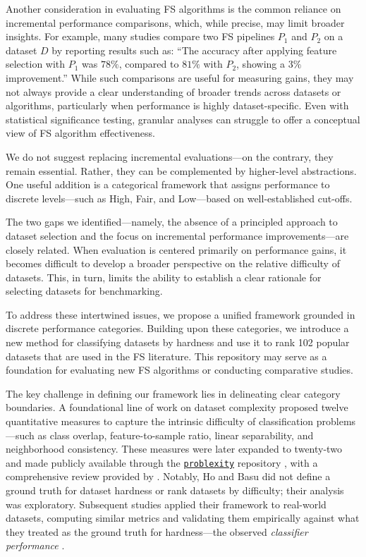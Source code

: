 \documentclass[preprint,12pt,authoryear]{elsarticle}
\begin{document}
Another consideration in evaluating FS algorithms is the common reliance on incremental performance comparisons, which, while precise, may limit broader insights. For example, many studies compare two FS pipelines \(P_1\) and \(P_2\) on a dataset \(D\) by reporting results such as: “The accuracy after applying feature selection with \(P_1\) was \(78\%\), compared to \(81\%\) with \(P_2\), showing a \(3\%\) improvement.” While such comparisons are useful for measuring gains, they may not always provide a clear understanding of broader trends across datasets or algorithms, particularly when performance is highly dataset-specific. Even with statistical significance testing, granular analyses can struggle to offer a conceptual view of FS algorithm effectiveness.

We do not suggest replacing incremental evaluations—on the contrary, they remain essential. Rather, they can be complemented by higher-level abstractions. One useful addition is a categorical framework that assigns performance to discrete levels—such as High, Fair, and Low—based on well-established cut-offs. 

The two gaps we identified—namely, the absence of a principled approach to dataset selection and the focus on incremental performance improvements—are closely related. When evaluation is centered primarily on performance gains, it becomes difficult to develop a broader perspective on the relative difficulty of datasets. This, in turn, limits the ability to establish a clear rationale for selecting datasets for benchmarking.

To address these intertwined issues, we propose a unified framework grounded in discrete performance categories. Building upon these categories, we introduce a new method for classifying datasets by hardness and use it to rank 102 popular datasets that are used in the FS literature. This repository may serve as a foundation for evaluating new FS algorithms or conducting comparative studies.


The key challenge in defining our framework lies in delineating clear category boundaries. A foundational line of work on dataset complexity \citep{ho2002complexity} proposed twelve quantitative measures to capture the intrinsic difficulty of classification problems—such as class overlap, feature-to-sample ratio, linear separability, and neighborhood consistency. These measures were later expanded to twenty-two and made publicly available through the \href{https://github.com/w4k2/problexity?utm_source=chatgpt.com}{\texttt{problexity}} repository \citep{problexity}, with a comprehensive review provided by \citet{lorena2019complexity}. Notably, Ho and Basu did not define a ground truth for dataset hardness or rank datasets by difficulty; their analysis was exploratory. Subsequent studies applied their framework to real-world datasets, computing similar metrics and validating them empirically against what they treated as the ground truth for hardness—the observed \emph{classifier performance} \citep{lorena2012complex,kamath2008structured,garcia2016multiple,moran2017data}. 
\end{document}

